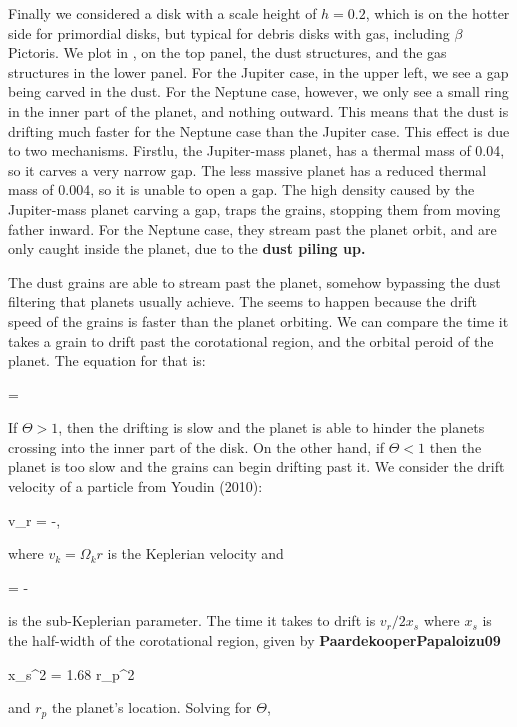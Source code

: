 \documentclass[onecolumn]{report}
\begin{document}
Finally we considered a disk with a scale height of $h=0.2$, which is on the hotter side for primordial disks, but typical for debris disks with gas, including $\beta$ Pictoris. We plot in , on the top panel, the dust structures, and the gas structures in the lower panel. For the Jupiter case, in the upper left, we see a gap being carved in the dust. For the Neptune case, however, we only see a small ring in the inner part of the planet, and nothing outward. This means that the dust is drifting much faster for the Neptune case than the Jupiter case. This effect is due to two mechanisms. Firstlu, the Jupiter-mass planet, has a thermal mass of 0.04, so it carves a very narrow gap. The less massive planet has a reduced thermal mass of 0.004, so it is unable to open a gap. The high density caused by the Jupiter-mass planet carving a gap, traps the grains, stopping them from moving father inward. For the Neptune case, they stream past the planet orbit, and are only caught inside the planet, due to the \textbf{dust piling up.}

The dust grains are able to stream past the planet, somehow bypassing the dust filtering that planets usually achieve. The seems to happen because the drift speed of the grains is faster than the planet orbiting. We can compare the time it takes a grain to drift past the corotational region, and the orbital peroid of the planet. The equation for that is:

\beq
\Theta  = 
\eeq

If $\Theta>1$, then the drifting is slow and the planet is able to hinder the planets crossing into the inner part of the disk. On the other hand, if $\Theta<1$ then the planet is too slow and the grains can begin drifting past it. We consider the drift velocity of a particle from Youdin (2010):

\beq
v_r = -,
\eeq

\noindent where $v_k=\varOmega_k r$ is the Keplerian velocity and

\beq
\eta \equiv = -
\eeq

\noindent is the sub-Keplerian parameter. The time it takes to drift is $v_r/2x_s$ where $x_s$ is the
half-width of the corotational region, given by \textbf{PaardekooperPapaloizu09}

\beq
x_s^2 = 1.68 r_p^2 
\eeq

\noindent and $r_p$ the planet's location. Solving for $\Theta$,
\end{document}
